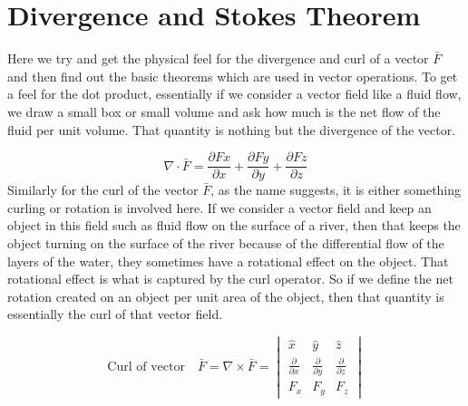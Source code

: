 \section{Divergence and Stokes Theorem}\label{lec:lec17}
Here we try and get the physical feel for the divergence and curl of a vector $\bar{F}$  and then find out the basic theorems which are used in vector operations.
To get a feel for the dot product, essentially if we consider a vector field like a fluid flow, we draw a small box or small volume and ask how much is the net flow of the fluid per unit volume. That quantity is nothing but the divergence of the vector.

\begin{equation}
\nabla\cdot \bar{F} = \frac{\partial Fx}{\partial x} + \frac{\partial Fy}{\partial y} + \frac{\partial Fz}{\partial z}	
\end{equation}
Similarly for the curl of the vector $\bar{F}$, as the name suggests, it is either something curling or rotation is involved here. If we consider a vector field and keep an object in this field such as fluid flow on the surface of a river, then that keeps the object turning on the surface of the river because of the differential flow of the layers of the water, they sometimes have a rotational effect on the object. That rotational effect is what is captured by the curl operator. So if we define the net rotation created on an object per unit area of the object, then that quantity is essentially the curl of that vector field.

\begin{dmath}
\text{Curl of vector} \quad \bar{F} = \nabla \times \bar{F} = 
\begin{vmatrix}
\hat{x} & \hat{y} & \hat{z}\\
\frac{\partial}{\partial x} & \frac{\partial}{\partial y} & \frac{\partial}{\partial z}\\
F_{x} & F_{y} & F_{z}
\end{vmatrix}
\end{dmath}

